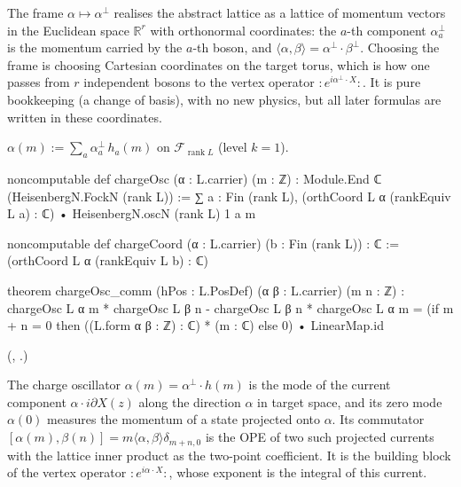 \begin{physics}
The frame $\alpha\mapsto\alpha^\perp$ realises the abstract lattice as a lattice of momentum vectors in the Euclidean space $\mathbb R^r$ with orthonormal coordinates: the $a$-th component $\alpha^\perp_a$ is the momentum carried by the $a$-th boson, and $\langle\alpha,\beta\rangle=\alpha^\perp\cdot\beta^\perp$. Choosing the frame is choosing Cartesian coordinates on the target torus, which is how one passes from $r$ independent bosons to the vertex operator $:\!e^{i\alpha^\perp\cdot X}\!:$. It is pure bookkeeping (a change of basis), with no new physics, but all later formulas are written in these coordinates.
\end{physics}

\begin{definition}\label{ch03:def:chargeOsc}
$\alpha(m):=\sum_{a}\alpha^\perp_a\,h_a(m)$ on $\mathcal F_{\operatorname{rank}L}$ (level $k=1$).
\end{definition}
\begin{leancode}
noncomputable def chargeOsc (α : L.carrier) (m : ℤ) :
    Module.End ℂ (HeisenbergN.FockN (rank L)) :=
  ∑ a : Fin (rank L), (orthCoord L α (rankEquiv L a) : ℂ) • HeisenbergN.oscN (rank L) 1 a m

noncomputable def chargeCoord (α : L.carrier) (b : Fin (rank L)) : ℂ :=
  (orthCoord L α (rankEquiv L b) : ℂ)

theorem chargeOsc_comm (hPos : L.PosDef) (α β : L.carrier) (m n : ℤ) :
    chargeOsc L α m * chargeOsc L β n - chargeOsc L β n * chargeOsc L α m
      = (if m + n = 0 then ((L.form α β : ℤ) : ℂ) * (m : ℂ) else 0) • LinearMap.id
\end{leancode}
(, .)

\begin{physics}
The charge oscillator $\alpha(m)=\alpha^\perp\cdot h(m)$ is the mode of the current component $\alpha\cdot i\partial X(z)$ along the direction $\alpha$ in target space, and its zero mode $\alpha(0)$ measures the momentum of a state projected onto $\alpha$. Its commutator $[\alpha(m),\beta(n)]=m\langle\alpha,\beta\rangle\delta_{m+n,0}$ is the OPE of two such projected currents with the lattice inner product as the two-point coefficient. It is the building block of the vertex operator $:\!e^{i\alpha\cdot X}\!:$, whose exponent is the integral of this current.
\end{physics}

